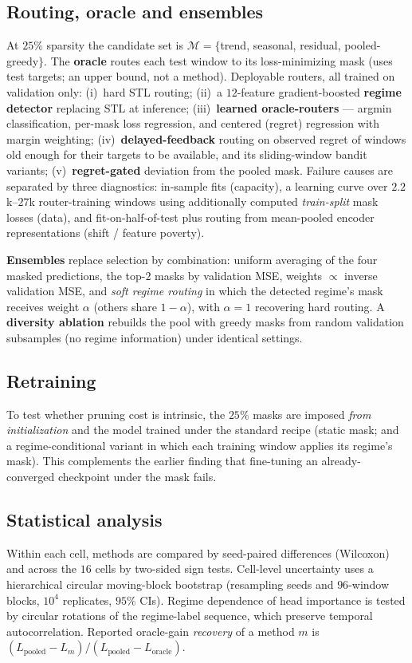 \subsection{Routing, oracle and ensembles}
\label{sec:methods-routing}
At $25\%$ sparsity the candidate set is
$\mathcal{M}=\{$trend, seasonal, residual, pooled-greedy$\}$. The
\textbf{oracle} routes each test window to its loss-minimizing mask
(uses test targets; an upper bound, not a method). Deployable routers,
all trained on validation only: (i)~hard STL routing;
(ii)~a $12$-feature gradient-boosted \textbf{regime detector} replacing
STL at inference; (iii)~\textbf{learned oracle-routers} --- argmin
classification, per-mask loss regression, and centered (regret)
regression with margin weighting; (iv)~\textbf{delayed-feedback}
routing on observed regret of windows old enough for their targets to be
available, and its sliding-window bandit variants;
(v)~\textbf{regret-gated} deviation from the pooled mask. Failure causes
are separated by three diagnostics: in-sample fits (capacity),
a learning curve over $2.2$k--$27$k router-training windows using
additionally computed \emph{train-split} mask losses (data), and
fit-on-half-of-test plus routing from mean-pooled encoder
representations (shift / feature poverty).

\textbf{Ensembles} replace selection by combination: uniform averaging of
the four masked predictions, the top-$2$ masks by validation MSE,
weights $\propto$ inverse validation MSE, and \emph{soft regime routing}
in which the detected regime's mask receives weight $\alpha$ (others
share $1-\alpha$), with $\alpha{=}1$ recovering hard routing. A
\textbf{diversity ablation} rebuilds the pool with greedy masks from
random validation subsamples (no regime information) under identical
settings.

\subsection{Retraining}
\label{sec:methods-scratch}
To test whether pruning cost is intrinsic, the $25\%$ masks are imposed
\emph{from initialization} and the model trained under the standard
recipe (static mask; and a regime-conditional variant in which each
training window applies its regime's mask). This complements the earlier
finding that fine-tuning an already-converged checkpoint under the mask
fails.

\subsection{Statistical analysis}
\label{sec:methods-stats}
Within each cell, methods are compared by seed-paired differences
(Wilcoxon) and across the $16$ cells by two-sided sign tests. Cell-level
uncertainty uses a hierarchical circular moving-block bootstrap
(resampling seeds and $96$-window blocks, $10^4$ replicates, $95\%$
CIs). Regime dependence of head importance is tested by circular
rotations of the regime-label sequence, which preserve temporal
autocorrelation. Reported oracle-gain \emph{recovery} of a method $m$ is
$(L_{\text{pooled}}-L_m)/(L_{\text{pooled}}-L_{\text{oracle}})$.
